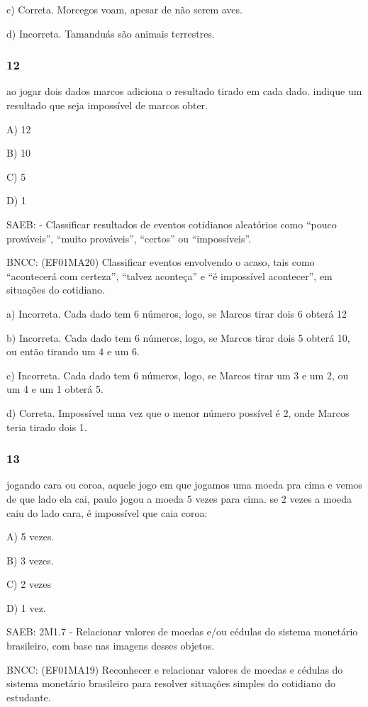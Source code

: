 c) Correta. Morcegos voam, apesar de não serem aves.

d) Incorreta. Tamanduás são animais terrestres.

\subsubsection{12}\label{section-143}

ao jogar dois dados marcos adiciona o resultado tirado em cada dado.
indique um resultado que seja impossível de marcos obter.

A) 12

B) 10

C) 5

D) 1

SAEB: - Classificar resultados de eventos cotidianos aleatórios como
``pouco prováveis'', ``muito prováveis'', ``certos'' ou ``impossíveis''.

BNCC: (EF01MA20) Classificar eventos envolvendo o acaso, tais como
``acontecerá com certeza'', ``talvez aconteça'' e ``é impossível
acontecer'', em situações do cotidiano.

a) Incorreta. Cada dado tem 6 números, logo, se Marcos tirar dois 6
obterá 12

b) Incorreta. Cada dado tem 6 números, logo, se Marcos tirar dois 5
obterá 10, ou então tirando um 4 e um 6.

c) Incorreta. Cada dado tem 6 números, logo, se Marcos tirar um 3 e um
2, ou um 4 e um 1 obterá 5.

d) Correta. Impossível uma vez que o menor número possível é 2, onde
Marcos teria tirado dois 1.

\subsubsection{13}\label{section-144}

jogando cara ou coroa, aquele jogo em que jogamos uma moeda pra cima e
vemos de que lado ela cai, paulo jogou a moeda 5 vezes para cima. se 2
vezes a moeda caiu do lado cara, é impossível que caia coroa:

A) 5 vezes.

B) 3 vezes.

C) 2 vezes

D) 1 vez.

SAEB: 2M1.7 - Relacionar valores de moedas e/ou cédulas do sistema
monetário brasileiro, com base nas imagens desses objetos.

BNCC: (EF01MA19) Reconhecer e relacionar valores de moedas e cédulas do
sistema monetário brasileiro para resolver situações simples do
cotidiano do estudante.

